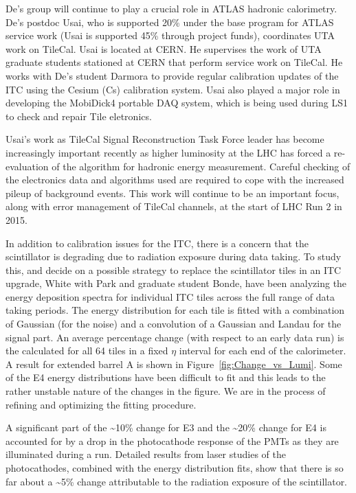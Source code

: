 De's group will continue to play a crucial role in ATLAS hadronic calorimetry. De's postdoc Usai, who is supported 20\% under the base program for ATLAS service work (Usai is supported 45\% through project funds), coordinates UTA  work on TileCal. Usai is located at CERN. He supervises the work of UTA graduate students stationed at CERN that perform service work on TileCal. He works with De's student Darmora to provide regular calibration updates of the ITC using the Cesium (Cs) calibration system. Usai also played a major role in developing the MobiDick4 portable DAQ system, which is being used during LS1 to check and repair Tile eletronics.

Usai's work as TileCal Signal Reconstruction Task Force leader has become increasingly important recently as higher luminosity at the LHC has forced a re-evaluation of the algorithm for hadronic energy measurement. Careful checking of the electronics data and algorithms used are required to cope with the increased pileup of background events. This work will continue to be an important focus, along with error management of TileCal channels, at the start of LHC Run 2 in 2015.

In addition to calibration issues for the ITC, there
is a concern that the scintillator is degrading due to radiation exposure
during data taking. To study this, and decide on a possible strategy to replace 
the scintillator tiles in an ITC upgrade, White with Park and graduate student
Bonde, have been analyzing the energy deposition spectra for individual ITC
tiles across the full range of data taking periods. The energy distribution
for each tile is fitted with a combination of Gaussian (for the noise) and a
convolution of a Gaussian and Landau for the signal part. An average percentage
change (with respect to an early data run) is the calculated for all 64 tiles
in a fixed $ \eta $ interval for each end of the calorimeter. A result for extended 
barrel A is shown in Figure~\ref{fig:Change_vs_Lumi}. Some of the E4 energy 
distributions have been difficult to fit and this leads to the rather unstable
nature of the changes in the figure. We are in the process of refining and optimizing 
the fitting procedure. 

A significant part of the \~{}10\% change for E3 and the \~{}20\% change for E4 is
accounted for by a drop in the photocathode response of the PMTs as they are
illuminated during a run. Detailed results from laser studies of the photocathodes,
combined with the energy distribution fits, show that there is so far about a \~{}5\% change
attributable to the radiation exposure of the scintillator.


